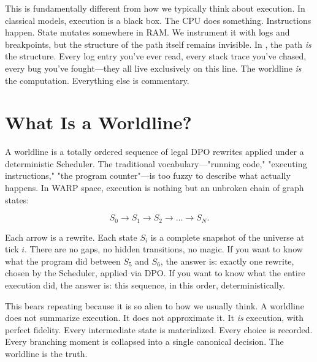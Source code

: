 This is fundamentally different from how we typically think about execution. In classical models,
execution is a black box. The CPU does something. Instructions happen. State mutates somewhere in
RAM. We instrument it with logs and breakpoints, but the structure of the path itself remains
invisible. In \COMPUTER{}, the path \emph{is} the structure. Every log entry you've ever read,
every stack trace you've chased, every bug you've fought—they all live exclusively on this line. The
worldline \emph{is} the computation. Everything else is commentary.

\section{What Is a Worldline?}
\label{sec:worldline-definition}

A worldline is a totally ordered sequence of legal DPO rewrites applied under a deterministic
Scheduler. The traditional vocabulary—"running code," "executing instructions," "the program
counter"—is too fuzzy to describe what actually happens. In WARP space, execution is nothing but an
unbroken chain of graph states:

\[
S_0 \to S_1 \to S_2 \to \dots \to S_N.
\]

Each arrow is a rewrite. Each state $S_i$ is a complete snapshot of the universe at tick $i$. There
are no gaps, no hidden transitions, no magic. If you want to know what the program did between $S_5$
and $S_6$, the answer is: exactly one rewrite, chosen by the Scheduler, applied via DPO. If you want
to know what the entire execution did, the answer is: this sequence, in this order, deterministically.

This bears repeating because it is so alien to how we usually think. A worldline does not summarize
execution. It does not approximate it. It \emph{is} execution, with perfect fidelity. Every
intermediate state is materialized. Every choice is recorded. Every branching moment is collapsed
into a single canonical decision. The worldline is the truth.


